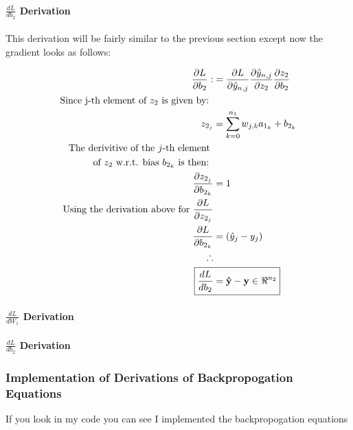 \documentclass[]{article}
\begin{document}
\paragraph{$\frac{dL}{db_2}$ Derivation}
This derivation will be fairly similar to the previous section except now the gradient looks as follows:

\begin{align*}
\frac{\partial L}{\partial b_2} : &=  \frac{\partial L }{\partial  \hat{y}_{n,j} } \frac{\partial  \hat{y}_{n,j} }{\partial z_2} \frac{\partial z_2}{\partial b_2}\\
\text{Since j-th element of $z_2$ is given by: } \\
z_{2_j} &= \sum_{k = 0}^{n_1}w_{j,k}a_{1_k} + b_{2_k}\\ 
\text{The derivitive of the $j$-th element }\\
\text{of $z_2$ w.r.t. bias $b_{2_k}$ is then: }\\
\frac{\partial z_{2_j}}{\partial b_{2_k}} &= 1\\
\text{Using the derivation above for  $\frac{\partial L}{\partial z_{2_j}}$}\\
\frac{\partial L}{\partial b_{2_k}} &=  (\hat{y}_j - y_j )\\
\therefore \\
\Aboxed{ \frac{dL}{db_2} &= \mathbf{\hat{y} - y}\in  \Re^{n_2}}\\
\end{align*}

\paragraph{$\frac{dL}{dW_1}$ Derivation}


\paragraph{$\frac{dL}{db_2}$ Derivation}

\subsubsection{Implementation of Derivations of Backpropogation Equations}
If you look in my code you can see I implemented the backpropogation equations
\end{document}
